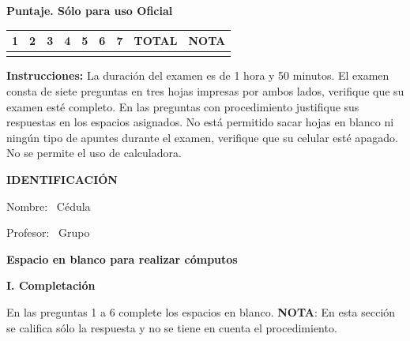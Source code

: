 \documentclass[11pt]{article}
\begin{document}
\examheader

\vspace{4pt}
\noindent
\begin{minipage}[t]{0.72\linewidth}
\textbf{Puntaje. Sólo para uso Oficial}\\[4pt]
\begin{tabular}{|c|c|c|c|c|c|c|c|c|}
\hline
1 & 2 & 3 & 4 & 5 & 6 & 7 & \textbf{TOTAL} & \textbf{NOTA} \\ \hline
 & & & & & & & & \\ \hline
\end{tabular}
\end{minipage}

\vspace{6pt}
\noindent\textbf{Instrucciones:} La duración del examen es de 1 hora y 50 minutos. El examen consta de siete preguntas en tres hojas impresas por ambos lados, verifique que su examen esté completo. En las preguntas con procedimiento justifique sus respuestas en los espacios asignados. No está permitido sacar hojas en blanco ni ningún tipo de apuntes durante el examen, verifique que su celular esté apagado. No se permite el uso de calculadora.

\vspace{6pt}
\noindent\textbf{IDENTIFICACIÓN}

\vspace{8pt}
\noindent Nombre: \dotfill\ Cédula \dotfill

\vspace{4pt}
\noindent Profesor: \dotfill\ Grupo \dotfill

\vspace{6pt}
\begin{center}
\textbf{Espacio en blanco para realizar cómputos}
\end{center}

\newpage
\noindent\textbf{\large I. Completación}

\vspace{2pt}
\noindent En las preguntas 1 a 6 complete los espacios en blanco. \textbf{NOTA}: En esta sección se califica sólo la respuesta y no se tiene en cuenta el procedimiento.
\end{document}
